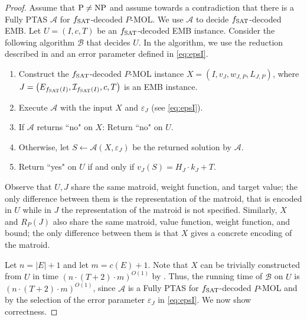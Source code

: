 \documentclass[11pt,letter]{article}
\newcommand{\cA}{{\mathcal{A}}}
\newcommand{\cB}{{\mathcal{B}}}
\newcommand{\cQ}{{\mathcal{Q}}}
\newcommand{\cI}{{\mathcal{I}}}
\newcommand{\fs}{f_{\textnormal{SAT}}}
\newcommand{\eps}{{\varepsilon}}
\begin{document}
\begin{proof}
	Assume that $\textnormal{P} \neq \textnormal{NP}$ and assume towards a contradiction that there is a Fully PTAS $\cA$ for $\fs$-decoded $P$-MOL. We use $\cA$ to decide $\fs$-decoded EMB. Let $U = (I,c,T)$  be an $\fs$-decoded EMB instance. %
	Consider the following algorithm $\cB$ that decides $U$. In the algorithm, we use the reduction described in  and an error parameter defined in \eqref{eq:epsI}. 
	\begin{enumerate}
		\item Construct the $\fs$-decoded $P$-MOL instance $X = (I,v_J,w_{J,P},L_{J,P})$, where \newline $J = \left(E_{\fs(I)},\cI_{\fs (I)},c,T\right)$ is an EMB instance.\label{step:1D} 
		\item 
		Execute $\cA$ with the input $X$ and $\eps_J$ (see \eqref{eq:epsI}). \label{step:2D} 
		\item If $\cA$ returns ``no" on $X$: Return ``no" on $U$. %
		\item Otherwise, let $S \leftarrow \cA(X,\eps_J)$ be the returned solution by $\cA$.\label{step:4D} 
		\item Return ``yes" on $U$ %
		if and only if $v_J(S) = H_J \cdot k_J+T$. \label{step:5D} 
	\end{enumerate}
	
	Observe that $U,J$ share the same matroid, weight function, and target value; the only difference between them is the representation of the matroid, that is encoded in $U$ while in $J$ the representation of the matroid is not specified. Similarly, $X$ and $R_P(J)$ also share the same matroid, value function, weight function, and bound; the only difference between them is that $X$ gives a concrete encoding of the matroid.  
	
	Let $n = |E|+1$ and let $m = c(E)+1$. Note that $X$ can be trivially constructed from $U$ in time $\left(n \cdot (T+2) \cdot m\right)^{O(1)}$ by . %
	Thus, the running time of $\cB$ on $U$ is $\left(n \cdot (T+2) \cdot m\right)^{O(1)}$, since $\cA$ is a Fully PTAS for $\fs$-decoded $P$-MOL and by the selection of the error parameter  $\eps_J$ in \eqref{eq:epsI}. %
	We now show correctness. %
	

\end{proof}
\end{document}
